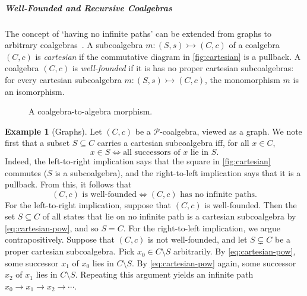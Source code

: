 \documentclass[10pt,a4paper]{article}
\theoremstyle{definition}
\newtheorem{example}[theorem]{Example}
\theoremstyle{remark}
\numberwithin{equation}{section}
\newcommand{\Pow}{\mathcal{P}}
\newcommand{\ar}{\mathsf{ar}}
\newcommand{\seq}{\subseteq}
\newcommand{\pullbackangle}[2][]{\arrow[phantom,to path={
                     -- ($ (\tikztostart)!1cm!#2:([xshift=8cm]\tikztostart) $)
                        node[anchor=west,pos=0.0,rotate=#2,
                        inner xsep = 0]
                        {\begin{tikzpicture}[minimum
                        height=1mm,baseline=0,#1]
    \draw[-] (0,0) -- (.5em,.5em) -- (0,1em);
                        \end{tikzpicture}}}]{}}
\newcommand{\monoto}{\rightarrowtail}
\theoremstyle{plain}
\theoremstyle{definition}
\begin{document}
\subparagraph*{Well-Founded and Recursive Coalgebras}\label{sec:prelim:wf-rec}
The concept of `having no infinite paths' can be extended from graphs to arbitrary coalgebras~\cite{taylor99}. A subcoalgebra $m\colon (S,s)\monoto (C,c)$ of a coalgebra $(C,c)$ is \emph{cartesian} if the commutative diagram in \autoref{fig:cartesian} is a pullback. A coalgebra $(C,c)$ is \emph{well-founded} if it is has no proper cartesian subcoalgebras: for every cartesian subcoalgebra $m\colon (S,s)\monoto (C,c)$, the monomorphism $m$ is an isomorphism.
\begin{figure}
  \begin{minipage}{.45\textwidth}\centering
  \caption{A cartesian subcoalgebra.}
  \label{fig:cartesian}
  \end{minipage}\hfill  \begin{minipage}{.5\textwidth}\centering
{}
  \caption{A coalgebra-to-algebra morphism.}
  \label{fig:coalg2alg}
  \end{minipage}
\end{figure}



\begin{example}[Graphs]\label{ex:wfCoalg}
Let $(C,c)$ be a $\Pow$-coalgebra, viewed as a graph. We note first that a subset $S\seq C$ carries a cartesian subcoalgebra iff, for all $x\in C$,
\begin{equation}\label{eq:cartesian-pow}
x\in S \iff \text{all successors of $x$ lie in $S$.}
\end{equation}
Indeed, the left-to-right implication says that the square in \autoref{fig:cartesian} commutes ($S$ is a subcoalgebra), and the right-to-left implication says that it is a pullback. From this, it follows that
\[ \text{$(C,c)$ is well-founded} \iff \text{$(C,c)$ has no infinite paths}. \]
 For the left-to-right implication, suppose that $(C,c)$ is well-founded. Then the set $S\seq C$ of all states that lie on no infinite path is a cartesian subcoalgebra by \eqref{eq:cartesian-pow}, and so $S=C$. For the right-to-left implication, we argue contrapositively. Suppose that $(C,c)$ is not well-founded, and let $S\subsetneq C$ be a proper cartesian subcoalgebra. Pick $x_0\in C\setminus S$ arbitrarily. By \eqref{eq:cartesian-pow}, some successor $x_1$ of $x_0$ lies in $C\setminus S$. By \eqref{eq:cartesian-pow} again, some successor $x_2$ of $x_1$ lies in $C\setminus S$. Repeating this argument yields an infinite path $x_0\to x_1\to x_2\to \cdots$.
\end{example}
\end{document}
